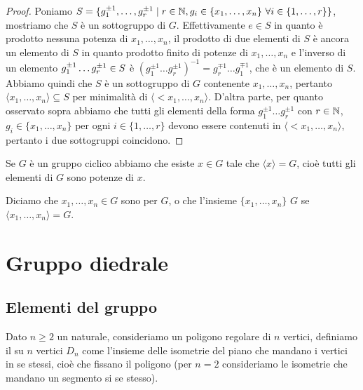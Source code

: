 \documentclass[11pt]{scrartcl}
\begin{document}
\begin{proof}
Poniamo $S = \{g_1^{\pm 1}, \dots, g_r^{\pm 1}\mid r \in \mathbb N, g_i \in \{x_1, \dots, x_n\}
~\forall i \in \{1, \dots, r\}\}$, mostriamo che $S$ è un sottogruppo di $G$. 
Effettivamente $e \in S$ in quanto è prodotto nessuna potenza di $x_1, \dots, x_n$, 
il prodotto di due elementi di $S$ è ancora un elemento di $S$ in quanto
prodotto finito di potenze di $x_1, \dots, x_n$ e l'inverso di un elemento
$g_1^{\pm 1}\dots g_r^{\pm 1} \in\nolinebreak S$ è $(g_1^{\pm 1}\dots 
g_r^{\pm 1})^{-1} = g_r^{\mp 1}\dots g_1^{\mp 1}$, che è un elemento di $S$.
Abbiamo quindi che $S$ è un sottogruppo di $G$ contenente $x_1, \dots, x_n$,
pertanto $\langle x_1, \dots, x_n\rangle\subseteq S$ per minimalità di $\langle <x_1,
\dots, x_n\rangle$. D'altra parte, per quanto osservato sopra abbiamo che
tutti gli elementi della forma $g_1^{\pm 1}\dots g_r^{\pm 1}$ con $r \in \mathbb N$, 
$g_i \in \{x_1, \dots, x_n\}$ per ogni $i \in \{1, \dots, r\}$ devono essere
contenuti in $\langle <x_1, \dots, x_n\rangle$, pertanto i due sottogruppi
coincidono.
\end{proof}

\begin{remark}
    Se $G$ è un gruppo ciclico abbiamo che esiste $x \in G$ tale che 
    $\langle x\rangle = G$, cioè tutti gli elementi di $G$ sono potenze di $x$.
\end{remark}

Diciamo che $x_1, \dots, x_n \in G$ sono  per $G$, o che 
l'insieme $\{x_1, \dots, x_n\}$  $G$ se $\langle x_1, \dots, x_n\rangle = G$.



\section{Gruppo diedrale}

\subsection{Elementi del gruppo}

\begin{definition}
    Dato $n \geq 2$ un naturale, consideriamo un poligono regolare di $n$ vertici,
    definiamo il  su $n$ vertici $D_n$ come l'insieme 
    delle isometrie del piano che mandano i vertici in se stessi, cioè che 
    fissano il poligono (per $n = 2$ consideriamo le isometrie che mandano un 
    segmento si se stesso).
\end{definition}
\end{document}
